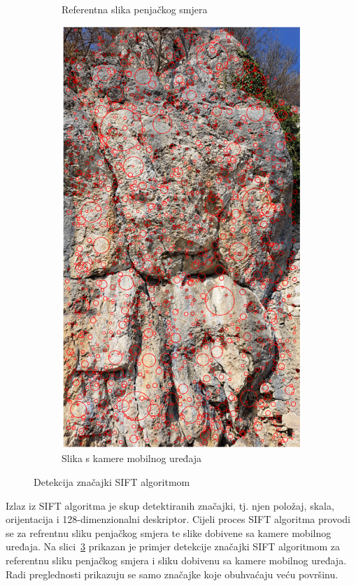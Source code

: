 \begin{figure}[H]
\begin{subfigure}[b]{0.48\textwidth}
        \caption{Referentna slika penjačkog smjera}
        \label{fig:feature_detection_train}
    \end{subfigure}
    \hfill
    \begin{subfigure}[b]{0.48\textwidth}
        \centering
        \includegraphics[width=\textwidth]{images/racunalniVid/feature_detection_frame.png}
        \caption{Slika s kamere mobilnog uređaja}
        \label{fig:feature_detection_frame}
    \end{subfigure}
    \caption{Detekcija značajki SIFT algoritmom}
    \label{fig:detekcija_znacajki}
\end{figure}

Izlaz iz SIFT algoritma je skup detektiranih značajki, tj. njen položaj, skala, orijentacija i 128-dimenzionalni deskriptor. Cijeli proces SIFT algoritma provodi se za refrentnu sliku penjačkog smjera te slike dobivene sa kamere mobilnog uređaja. Na slici~\ref{fig:detekcija_znacajki} prikazan je primjer detekcije značajki SIFT algoritmom za referentnu sliku penjačkog smjera i sliku dobivenu sa kamere mobilnog uređaja. Radi preglednosti prikazuju se samo značajke koje obuhvaćaju veću površinu.

